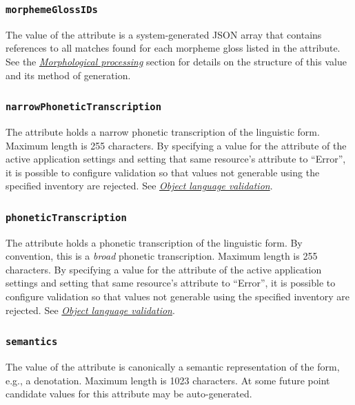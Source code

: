 \documentclass[letterpaper,10pt,english]{sphinxmanual}
\begin{document}
\subsubsection{\texttt{morphemeGlossIDs}}
\label{datastructure:morphemeglossids}
The value of the  attribute is a system-generated JSON array
that contains references to all matches found for each morpheme gloss listed in
the  attribute.  See the {\hyperref[interface:morphological-processing]{\emph{Morphological processing}}}
section for details on the structure of this value and its method of generation.


\subsubsection{\texttt{narrowPhoneticTranscription}}
\label{datastructure:narrowphonetictranscription}
The  attribute holds a narrow phonetic
transcription of the linguistic form.  Maximum length is 255 characters.  By
specifying a value for the  attribute of the active
application settings and setting that same resource's
 attribute to ``Error'', it is possible to configure
 validation so that values not generable using the
specified inventory are rejected.  See {\hyperref[interface:object-language-validation]{\emph{Object language validation}}}.


\subsubsection{\texttt{phoneticTranscription}}
\label{datastructure:phonetictranscription}
The  attribute holds a phonetic transcription of the
linguistic form.  By convention, this is a \emph{broad} phonetic transcription.
Maximum length is 255 characters.  By specifying a value for the
 attribute of the active application settings and
setting that same resource's  attribute to ``Error'',
it is possible to configure  validation so that values
not generable using the specified inventory are rejected.  See
{\hyperref[interface:object-language-validation]{\emph{Object language validation}}}.


\subsubsection{\texttt{semantics}}
\label{datastructure:semantics}
The value of the  attribute is canonically a semantic
representation of the form, e.g., a denotation.  Maximum length is 1023
characters.  At some future point candidate values for this attribute may be
auto-generated.
\end{document}
